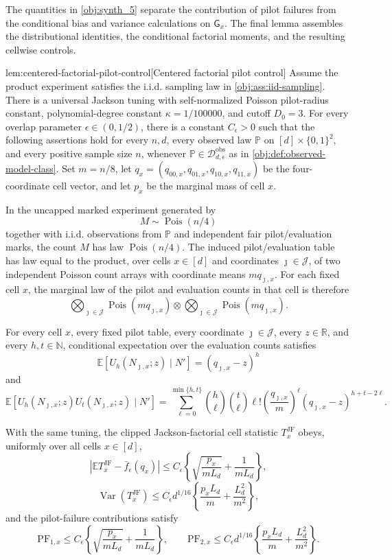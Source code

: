 The quantities in \cref{obj:synth_5} separate the contribution of pilot failures from the conditional bias and variance calculations on \(\mathsf G_x\). The final lemma assembles the distributional identities, the conditional factorial moments, and the resulting cellwise controls.

\begin{lemmav}{lem:centered-factorial-pilot-control}[Centered factorial pilot control]
Assume the product experiment satisfies the i.i.d. sampling law in \cref{obj:ass:iid-sampling}.  There is a universal Jackson tuning with self-normalized Poisson pilot-radius constant, polynomial-degree constant \(\kappa=1/100000\), and cutoff \(D_0=3\).  For every overlap parameter \(\epsilon\in(0,1/2)\), there is a constant \(C_\epsilon>0\) such that the following assertions hold for every \(n,d\), every observed law \(\mathbb P\) on \([d]\times\{0,1\}^2\), and every positive sample size \(n\), whenever \(\mathbb P\in\mathcal D_{d,\epsilon}^{\mathrm{obs}}\) as in \cref{obj:def:observed-model-class}.  Set \(m=n/8\), let \(q_x=(q_{00,x},q_{01,x},q_{10,x},q_{11,x})\) be the four-coordinate cell vector, and let \(p_x\) be the marginal mass of cell \(x\).

In the uncapped marked experiment generated by
\[
M\sim \operatorname{Pois}(n/4)
\]
together with i.i.d. observations from \(\mathbb P\) and independent fair pilot/evaluation marks, the count \(M\) has law \(\operatorname{Pois}(n/4)\).  The induced pilot/evaluation table has law equal to the product, over cells \(x\in[d]\) and coordinates \(\jmath\in\mathcal J\), of two independent Poisson count arrays with coordinate means \(m q_{\jmath,x}\).  For each fixed cell \(x\), the marginal law of the pilot and evaluation counts in that cell is therefore
\[
\bigotimes_{\jmath\in\mathcal J}\operatorname{Pois}(m q_{\jmath,x})
\otimes
\bigotimes_{\jmath\in\mathcal J}\operatorname{Pois}(m q_{\jmath,x}).
\]

For every cell \(x\), every fixed pilot table, every coordinate \(\jmath\in\mathcal J\), every \(z\in\mathbb R\), and every \(h,t\in\mathbb N\), conditional expectation over the evaluation counts satisfies
\[
\mathbb E\!\left[U_h(N_{\jmath,x};z)\mid N'\right]
=
(q_{\jmath,x}-z)^h
\]
and
\[
\mathbb E\!\left[U_h(N_{\jmath,x};z)U_t(N_{\jmath,x};z)\mid N'\right]
=
\sum_{\ell=0}^{\min\{h,t\}}
\binom{h}{\ell}\binom{t}{\ell}\ell!
\left(\frac{q_{\jmath,x}}{m}\right)^\ell
(q_{\jmath,x}-z)^{h+t-2\ell}.
\]

With the same tuning, the clipped Jackson-factorial cell statistic \(T_x^{\mathrm{JF}}\) obeys, uniformly over all cells \(x\in[d]\),
\[
\left|
\mathbb E T_x^{\mathrm{JF}}-\bar f_\epsilon(q_x)
\right|
\le
C_\epsilon
\left\{
\sqrt{\frac{p_x}{mL_d}}+\frac{1}{mL_d}
\right\},
\]
\[
\operatorname{Var}(T_x^{\mathrm{JF}})
\le
C_\epsilon d^{1/16}
\left\{
\frac{p_x L_d}{m}+\frac{L_d^2}{m^2}
\right\},
\]
and the pilot-failure contributions satisfy
\[
\mathrm{PF}_{1,x}
\le
C_\epsilon
\left\{
\sqrt{\frac{p_x}{mL_d}}+\frac{1}{mL_d}
\right\},
\qquad
\mathrm{PF}_{2,x}
\le
C_\epsilon d^{1/16}
\left\{
\frac{p_x L_d}{m}+\frac{L_d^2}{m^2}
\right\}.
\]
\end{lemmav}

